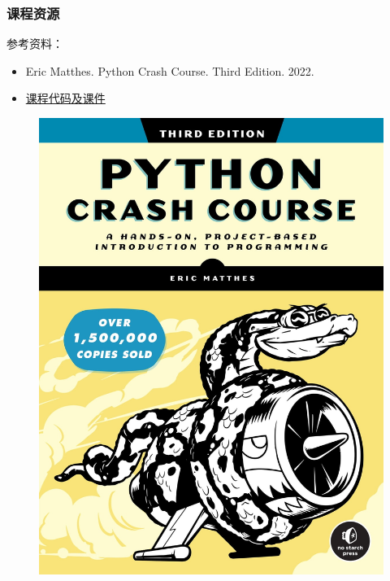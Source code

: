 \documentclass[aspectratio=169, 14pt]{beamer}
\begin{document}
\begin{frame}
	\frametitle{课程资源}
	参考资料：
	\begin{itemize}
		\item Eric Matthes. \alert{Python Crash Course}. Third Edition. 2022.
		\item \href{https://github.com/ChenZhongPu/python-swufe}{课程代码及课件}
	\end{itemize}

	\begin{figure}
		\includegraphics[height=.35\paperheight]{week1/python-crash-course-3rd-edition.jpg}
	\end{figure}

\end{frame}
\end{document}
